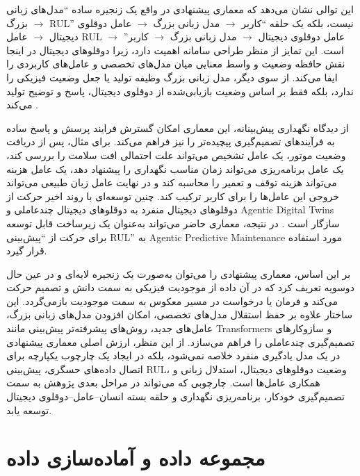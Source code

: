 این توالی نشان می‌دهد که معماری پیشنهادی در واقع یک زنجیره ساده ``مدل‌های زبانی بزرگ $\rightarrow$ \gls{RUL}'' نیست، بلکه یک حلقه ``کاربر $\rightarrow$ مدل زبانی بزرگ $\rightarrow$ عامل دوقلوی دیجیتال $\rightarrow$ عامل \gls{RUL} $\rightarrow$ عامل دوقلوی دیجیتال $\rightarrow$ مدل زبانی بزرگ $\rightarrow$ کاربر'' است. این تمایز از منظر طراحی سامانه اهمیت دارد، زیرا دوقلو‌های دیجیتال در اینجا نقش حافظه وضعیت و واسط معنایی میان مدل‌های تخصصی و عامل‌های کاربردی را ایفا می‌کند. از سوی دیگر، مدل‌ زبانی بزرگ وظیفه تولید یا جعل وضعیت فیزیکی را ندارد، بلکه فقط بر اساس وضعیت بازیابی‌شده از دوقلوی دیجیتال، پاسخ و توضیح تولید می‌کند \cite{zhou2026dtai,fu2026genaidt}.

از دیدگاه نگهداری پیش‌بینانه، این معماری امکان گسترش فرایند پرسش و پاسخ ساده به فرآیندهای تصمیم‌گیری پیچیده‌تر را نیز فراهم می‌کند. برای مثال، پس از دریافت وضعیت موتور، یک عامل تشخیص می‌تواند علت احتمالی افت سلامت را بررسی کند، یک عامل برنامه‌ریزی می‌تواند زمان مناسب نگهداری را پیشنهاد دهد، یک عامل هزینه می‌تواند هزینه توقف و تعمیر را محاسبه کند و در نهایت عامل زبان طبیعی می‌تواند خروجی این عامل‌ها را برای کاربر ترکیب کند. چنین توسعه‌ای با روند اخیر حرکت از دوقلو‌های دیجیتال منفرد به دوقلو‌های دیجیتال چندعاملی و \glspl{Agentic Digital Twin}  سازگار است \cite{coulibaly2026madtdt}. در نتیجه، معماری حاضر می‌تواند به‌عنوان یک زیرساخت قابل توسعه برای حرکت از ``پیش‌بینی \gls{RUL}'' به \gls{Agentic Predictive Maintenance} مورد استفاده قرار گیرد.

بر این اساس، معماری پیشنهادی را می‌توان به‌صورت یک زنجیره لایه‌ای و در عین حال دوسویه تعریف کرد که در آن داده از موجودیت فیزیکی به سمت دانش و تصمیم حرکت می‌کند و فرمان یا درخواست در مسیر معکوس به سمت موجودیت بازمی‌گردد. این ساختار علاوه بر حفظ استقلال مدل‌های تخصصی، امکان افزودن مدل‌های زبانی بزرگ، عامل‌های جدید، روش‌های پیشرفته‌تر پیش‌بینی مانند \glspl{Transformer} و سازوکارهای تصمیم‌گیری چندعاملی را فراهم می‌سازد. از این منظر، ارزش اصلی معماری پیشنهادی در یک مدل یادگیری منفرد خلاصه نمی‌شود، بلکه در ایجاد یک چارچوب یکپارچه برای اتصال داده‌های حسگری، پیش‌بینی \gls{RUL}، وضعیت دوقلو‌های دیجیتال، استدلال زبانی و همکاری عامل‌ها است. چارچوبی که می‌تواند در مراحل بعدی پژوهش به سمت تصمیم‌گیری خودکار، برنامه‌ریزی نگهداری و حلقه بسته انسان--عامل--دوقلوی‌ دیجیتال توسعه یابد.


\section{مجموعه داده  و آماده‌سازی داده}
\label{sec:dataset}

